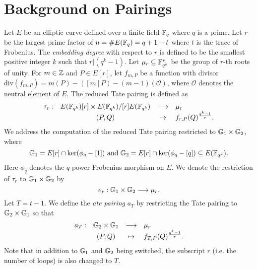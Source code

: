 \section{Background on Pairings}
\label{sec:background}

Let $E$ be an elliptic curve defined over a finite field $\mathbb{F}_{q}$ where $q$ is a prime.
Let $r$ be the largest prime factor of $n = \#E(\mathbb{F}_{q}) = q + 1 - t$ where $t$ is the trace of Frobenius.
The \emph{embedding degree} with respect to $r$ is defined to be the smallest positive integer $k$ such that $r | (q^k-1)$.
Let $\mu_{r} \subseteq \mathbb{F}_{q^{k}}^{*}$ be the group of $r$-th roots of unity.
For $m \in \mathbb{Z}$ and $P \in E[r]$,
let $f_{m,P}$ be a function with divisor 
$\text{div}(f_{m,P}) = m(P) - ([m]P) - (m-1)(\mathcal{O})$,
where $\mathcal{O}$ denotes the neutral element of $E$.
The reduced Tate pairing is defined as
\[\begin{array}{rccl}
\tau_{r} :	& E(\mathbb{F}_{q^{k}})[r] \times E(\mathbb{F}_{q^{k}})/[r]E(\mathbb{F}_{q^{k}})	& \longrightarrow	& \mu_{r} \\
		& (P,Q)								& \mapsto		& f_{r,P}(Q)^{\frac{q^{k}-1}{r}}.
\end{array}\]
We address the computation of the reduced Tate pairing restricted to $\mathbb{G}_{1} \times \mathbb{G}_{2}$, where
$$\mathbb{G}_{1} = E[r] \cap \ker(\phi_{q}-[1]) \text{ and }
\mathbb{G}_{2} = E[r] \cap \ker(\phi_{q} - [q]) \subseteq E(\mathbb{F}_{q^{k}}).$$
Here $\phi_{q}$ denotes the $q$-power Frobenius morphism on $E$.
We denote the restriction of $\tau_{r}$ to $\mathbb{G}_{1} \times \mathbb{G}_{2}$ by
$$e_{r} : \mathbb{G}_{1} \times \mathbb{G}_{2} \longrightarrow \mu_{r}.$$
Let $T = t-1$.
We define the \emph{ate pairing} $a_{T}$ by restricting the Tate pairing to $\mathbb{G}_{2} \times \mathbb{G}_{1}$ so that
\[\begin{array}{rccl}
a_{T} :	& \mathbb{G}_{2} \times \mathbb{G}_{1}	& \longrightarrow	& \mu_{r} \\
	& (P,Q) 		& \mapsto		& f_{T,P}(Q)^{\frac{q^{k}-1}{r}}.
\end{array}\]
Note that in addition to $\mathbb{G}_{1}$ and $\mathbb{G}_{2}$ being switched, the subscript $r$ (i.e. the number of loops) is also changed to $T$.


